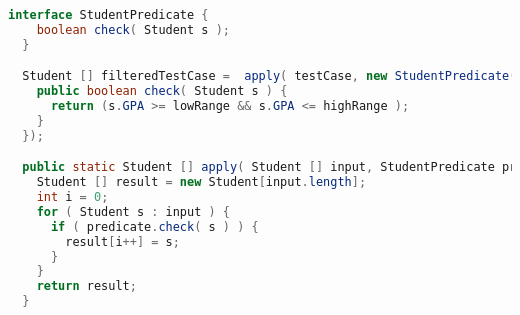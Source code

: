 \documentclass[11pt]{exam}
\begin{document}
\begin{questions}
\begin{lstlisting}[language=Java]
  interface StudentPredicate {
    boolean check( Student s );
  }

  Student [] filteredTestCase =  apply( testCase, new StudentPredicate() {
    public boolean check( Student s ) {
      return (s.GPA >= lowRange && s.GPA <= highRange );
    }
  });

  public static Student [] apply( Student [] input, StudentPredicate predicate ) {
    Student [] result = new Student[input.length];
    int i = 0;
    for ( Student s : input ) {
      if ( predicate.check( s ) ) {
        result[i++] = s;
      }
    }
    return result;
  }
\end{lstlisting}
\end{questions}
\end{document}
